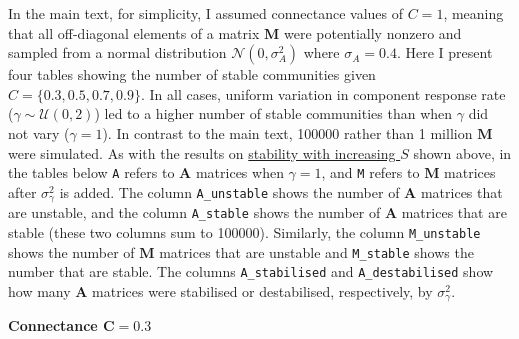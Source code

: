 \documentclass[]{article}
\begin{document}
In the main text, for simplicity, I assumed connectance values of
\(C = 1\), meaning that all off-diagonal elements of a matrix
\(\mathbf{M}\) were potentially nonzero and sampled from a normal
distribution \(\mathcal{N}(0, \sigma^{2}_{A})\) where
\(\sigma_{A} = 0.4\). Here I present four tables showing the number of
stable communities given \(C = \{0.3, 0. 5, 0.7, 0.9 \}\). In all cases,
uniform variation in component response rate
(\(\gamma \sim \mathcal{U}(0, 2)\)) led to a higher number of stable
communities than when \(\gamma\) did not vary (\(\gamma = 1\)). In
contrast to the main text, 100000 rather than 1 million \(\mathbf{M}\)
were simulated. As with the results on
\protect\hyperlink{IncrS}{stability with increasing \(S\)} shown above,
in the tables below \texttt{A} refers to \(\mathbf{A}\) matrices when
\(\gamma = 1\), and \texttt{M} refers to \(\mathbf{M}\) matrices after
\(\sigma^{2}_{\gamma}\) is added. The column \texttt{A\_unstable} shows
the number of \(\mathbf{A}\) matrices that are unstable, and the column
\texttt{A\_stable} shows the number of \(\mathbf{A}\) matrices that are
stable (these two columns sum to 100000). Similarly, the column
\texttt{M\_unstable} shows the number of \(\mathbf{M}\) matrices that
are unstable and \texttt{M\_stable} shows the number that are stable.
The columns \texttt{A\_stabilised} and \texttt{A\_destabilised} show how
many \(\mathbf{A}\) matrices were stabilised or destabilised,
respectively, by \(\sigma^{2}_{\gamma}\).

\textbf{Connectance \(\mathbf{C = 0.3}\)}
\end{document}
